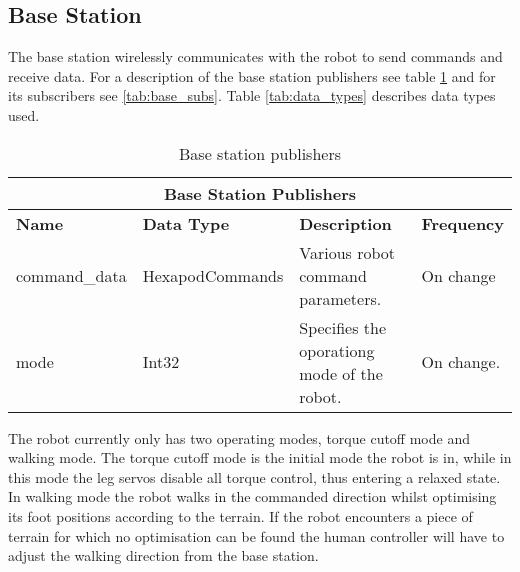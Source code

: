    \subsection{Base Station} \label{sec:base_ros}
        The base station wirelessly communicates with the robot to send commands and receive data.
        For a description of the base station publishers see table \ref{tab:base_pubs} and for its subscribers see \ref{tab:base_subs}. Table \ref{tab:data_types} describes
        data types used.
        \begin{table}[h]
            \centering
            \begin{tabularx}{\textwidth}{| l | l | X | l |}
                \hline
                \multicolumn{4}{|c|}{\textbf{Base Station Publishers}} \\ \hline
                \textbf{Name} & \textbf{Data Type} & \textbf{Description} & \textbf{Frequency} \\ \hline
                command\_data & HexapodCommands & Various robot command parameters. & On change \\ \hline
                mode & Int32 & Specifies the oporationg mode of the robot. & On change. \\ \hline
            \end{tabularx}
            \caption{Base station publishers}
            \label{tab:base_pubs}
        \end{table}
        
        The robot currently only has two operating modes, torque cutoff mode and walking mode. The torque cutoff mode is the initial mode the robot is in,
        while in this mode the leg servos disable all torque control, thus entering a relaxed state. In walking mode the robot walks in the commanded direction
        whilst optimising its foot positions according to the terrain. If the robot encounters a piece of terrain for which no optimisation can be found the
        human controller will have to adjust the walking direction from the base station.

